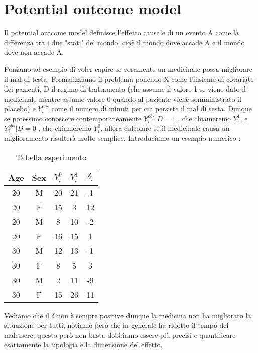 \chapter{Potential outcome model}
\label{chapt:PotentialOM}
Il potential outcome model definisce l'effetto causale di un evento A come la differenza tra i due "stati" del mondo, cioè il mondo dove accade A e il mondo dove non accade A.

Poniamo ad esempio di voler capire se veramente un medicinale possa migliorare il mal di testa. Formalizziamo il problema ponendo X come l'insieme di covariate dei pazienti, D il regime di trattamento (che assume il valore 1 se viene dato il medicinale mentre assume valore 0 quando al paziente viene somministrato il placebo) e $Y^{obs}_i$ come il numero di minuti per cui persiste il mal di testa. 
Dunque se potessimo conoscere contemporaneamente  $Y^{obs}_i|D=1$ , che chiameremo $Y^{1}_i$, e $Y^{obs}_i|D=0$ , che chiameremo $Y^{0}_i$, allora calcolare se il medicinale causa un miglioramento risulterà molto semplice. Introduciamo un esempio numerico : 
\begin{table}[H]
\centering
\begin{tabular}{|c|c|c|c|c|}
\hline
Age & Sex & $Y^{0}_i$ & $Y^{1}_i$ & $\delta_i$ \\ \hline
20 & M & 20 & 21 & -1  \\ \hline
20 & F & 15 & 3 & 12 \\ \hline
20 & M & 8 & 10 & -2 \\ \hline
20 & F & 16 & 15 & 1 \\ \hline
30 & M & 12 & 13 & -1 \\ \hline
30 & F & 8 & 5 & 3 \\ \hline
30 & M & 2 & 11 & -9  \\ \hline
30 & F & 15 & 26 & 11 \\ \hline
\end{tabular}
\caption{Tabella esperimento }
\end{table}
Vediamo che il $\delta$ non è sempre positivo dunque la medicina non ha migliorato la situazione per tutti, notiamo però che in generale ha ridotto il tempo del malessere, questo però non basta dobbiamo essere più precisi e quantificare esattamente la tipologia e la dimensione del effetto.

